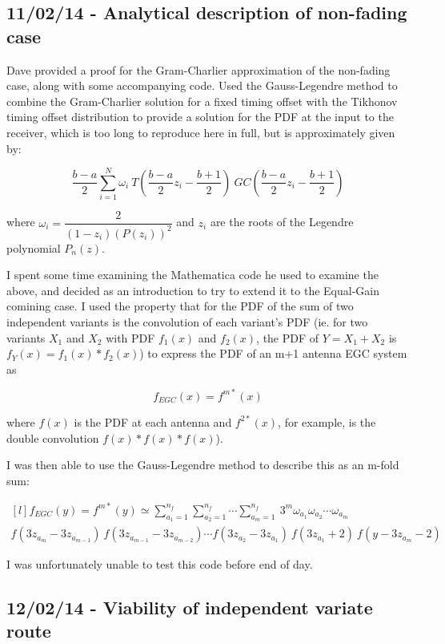 \subsection{11/02/14 - Analytical description of non-fading case}

Dave provided a proof for the Gram-Charlier approximation of the
non-fading case, along with some accompanying code. Used the
Gauss-Legendre method to combine the Gram-Charlier solution for a fixed
timing offset with the Tikhonov timing offset distribution to provide a
solution for the PDF at the input to the receiver, which is too long to
reproduce here in full, but is approximately given by:

\[
\dfrac{b-a}{2} \sum\limits_{i=1}^N \omega_i \: T \left (\dfrac{b-a}{2} z_i - \dfrac{b+1}{2} \right ) \: GC \left (\dfrac{b-a}{2} z_i - \dfrac{b+1}{2} \right )
\]

where $\omega_i = \dfrac{2}{(1-z_i)(P(z_i))^2}$ and $z_i$ are the roots
of the Legendre polynomial $P_n(z)$.

I spent some time examining the Mathematica code he used to examine the
above, and decided as an introduction to try to extend it to the
Equal-Gain comining case. I used the property that for the PDF of the
sum of two independent variants is the convolution of each variant's PDF
(ie. for two variants $X_1$ and $X_2$ with PDF $f_1(x)$ and $f_2(x)$,
the PDF of $Y=X_1+X_2$ is $f_Y(x) = f_1(x) \ast f_2(x)$) to express the
PDF of an m+1 antenna EGC system as

\[
f_{EGC}(x) = f^{m \ast}(x)
\]

where $f(x)$ is the PDF at each antenna and $f^{2 \ast}(x)$, for
example, is the double convolution $f(x) \ast f(x) \ast f(x)$).

I was then able to use the Gauss-Legendre method to describe this as an
m-fold sum:

\[
\begin{matrix*}[l]
f_{EGC}(y) = f^{m \ast}(y) \simeq \sum\limits_{a_1=1}^{n_f} \sum\limits_{a_2=1}^{n_f} \cdots \sum\limits_{a_m=1}^{n_f} \: 3^m \omega_{a_1} \omega_{a_2} \cdots \omega_{a_m} \\
f(3 z_{a_m} - 3 z_{a_{m-1}}) \: f(3 z_{a_{m-1}} - 3 z_{a_{m-2}}) \cdots f(3 z_{a_2} - 3 z_{a_1}) \: f(3 z_{a_1} + 2) \: f(y - 3 z_{a_m} - 2) 
\end{matrix*}
\]

I was unfortunately unable to test this code before end of day.

\subsection{12/02/14 - Viability of independent variate route}

